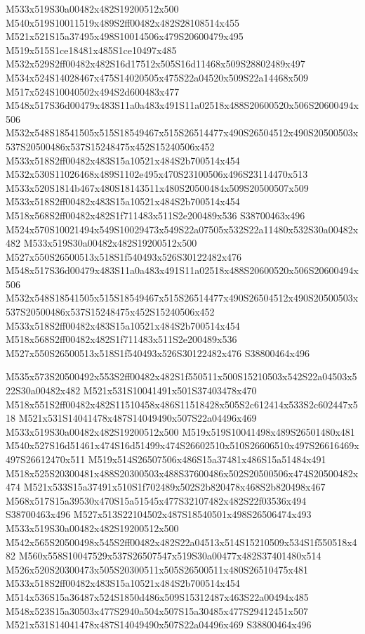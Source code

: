 \documentclass{article}
\begin{document}
\begin{multicols}{2}
M533x519S30a00482x482S19200512x500 M540x519S10011519x489S2ff00482x482S28108514x455 M521x521S15a37495x498S10014506x479S20600479x495 M519x515S1ce18481x485S1ce10497x485 M532x529S2ff00482x482S16d17512x505S16d11468x509S28802489x497 M534x524S14028467x475S14020505x475S22a04520x509S22a14468x509 M517x524S10040502x494S2d600483x477 M548x517S36d00479x483S11a0a483x491S11a02518x488S20600520x506S20600494x506 M532x548S18541505x515S18549467x515S26514477x490S26504512x490S20500503x537S20500486x537S15248475x452S15240506x452 M533x518S2ff00482x483S15a10521x484S2b700514x454 M532x530S11026468x489S1102e495x470S23100506x496S23114470x513 M533x520S1814b467x480S18143511x480S20500484x509S20500507x509 M533x518S2ff00482x483S15a10521x484S2b700514x454 M518x568S2ff00482x482S1f711483x511S2e200489x536 S38700463x496 M524x570S10021494x549S10029473x549S22a07505x532S22a11480x532S30a00482x482 M533x519S30a00482x482S19200512x500 M527x550S26500513x518S1f540493x526S30122482x476 M548x517S36d00479x483S11a0a483x491S11a02518x488S20600520x506S20600494x506 M532x548S18541505x515S18549467x515S26514477x490S26504512x490S20500503x537S20500486x537S15248475x452S15240506x452 M533x518S2ff00482x483S15a10521x484S2b700514x454 M518x568S2ff00482x482S1f711483x511S2e200489x536 M527x550S26500513x518S1f540493x526S30122482x476 S38800464x496

M535x573S20500492x553S2ff00482x482S1f550511x500S15210503x542S22a04503x522S30a00482x482 M521x531S10041491x501S37403478x470 M518x551S2ff00482x482S11510458x486S11518428x505S2c612414x533S2c602447x518 M521x531S14041478x487S14049490x507S22a04496x469 M533x519S30a00482x482S19200512x500 M519x519S10041498x489S26501480x481 M540x527S16d51461x474S16d51499x474S26602510x510S26606510x497S26616469x497S26612470x511 M519x514S26507506x486S15a37481x486S15a51484x491 M518x525S20300481x488S20300503x488S37600486x502S20500506x474S20500482x474 M521x533S15a37491x510S1f702489x502S2b820478x468S2b820498x467 M568x517S15a39530x470S15a51545x477S32107482x482S22f03536x494 S38700463x496 M527x513S22104502x487S18540501x498S26506474x493 M533x519S30a00482x482S19200512x500 M542x565S20500498x545S2ff00482x482S22a04513x514S15210509x534S1f550518x482 M560x558S10047529x537S26507547x519S30a00477x482S37401480x514 M526x520S20300473x505S20300511x505S26500511x480S26510475x481 M533x518S2ff00482x483S15a10521x484S2b700514x454 M514x536S15a36487x524S1850d486x509S15312487x463S22a00494x485 M548x523S15a30503x477S2940a504x507S15a30485x477S29412451x507 M521x531S14041478x487S14049490x507S22a04496x469 S38800464x496


\end{multicols}
\end{document}

